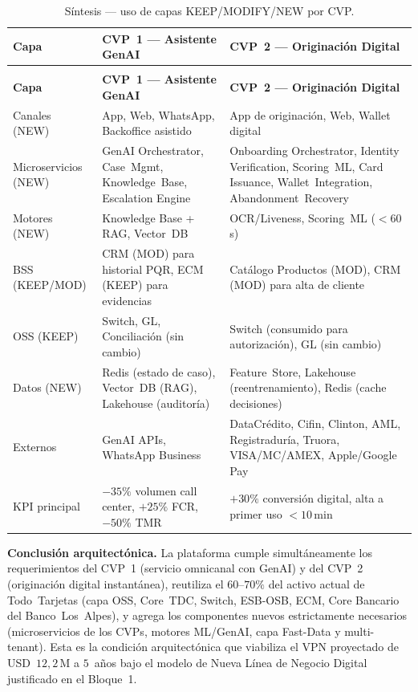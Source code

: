 \documentclass[11pt,letterpaper]{article}
\begin{document}
{\small
\renewcommand{\arraystretch}{1.25}
\begin{xltabular}{\textwidth}{@{}>{\RaggedRight\arraybackslash}p{2.7cm}@{\hspace{6pt}}>{\RaggedRight\arraybackslash}X@{\hspace{6pt}}>{\RaggedRight\arraybackslash}X@{}}
\caption{Síntesis — uso de capas KEEP/MODIFY/NEW por CVP.\label{tab:sintesis}}\\
\toprule
\textbf{Capa} & \textbf{CVP~1 — Asistente GenAI} & \textbf{CVP~2 — Originación Digital} \\
\midrule
\endfirsthead
{}\\
\toprule
\textbf{Capa} & \textbf{CVP~1 — Asistente GenAI} & \textbf{CVP~2 — Originación Digital} \\
\midrule
\endhead
\bottomrule
\endlastfoot
Canales (NEW) & App, Web, WhatsApp, Backoffice asistido & App de originación, Web, Wallet digital \\
Microservicios (NEW) & GenAI Orchestrator, Case~Mgmt, Knowledge~Base, Escalation Engine & Onboarding Orchestrator, Identity Verification, Scoring~ML, Card Issuance, Wallet~Integration, Abandonment~Recovery \\
Motores (NEW) & Knowledge Base + RAG, Vector~DB & OCR/Liveness, Scoring~ML ($<60$\,s) \\
BSS (KEEP/MOD) & CRM (MOD) para historial PQR, ECM (KEEP) para evidencias & Catálogo Productos (MOD), CRM (MOD) para alta de cliente \\
OSS (KEEP) & Switch, GL, Conciliación (sin cambio) & Switch (consumido para autorización), GL (sin cambio) \\
Datos (NEW) & Redis (estado de caso), Vector~DB (RAG), Lakehouse (auditoría) & Feature~Store, Lakehouse (reentrenamiento), Redis (cache decisiones) \\
Externos & GenAI APIs, WhatsApp Business & DataCrédito, Cifin, Clinton, AML, Registraduría, Truora, VISA/MC/AMEX, Apple/Google Pay \\
KPI principal & $-35\%$ volumen call center, $+25\%$ FCR, $-50\%$ TMR & $+30\%$ conversión digital, alta a primer uso $<10$\,min \\
\end{xltabular}}

\noindent\textbf{Conclusión arquitectónica.} La plataforma cumple
simultáneamente los requerimientos del CVP~1 (servicio omnicanal con
GenAI) y del CVP~2 (originación digital instantánea), reutiliza el
$60$--$70\%$ del activo actual de Todo~Tarjetas (capa OSS, Core~TDC,
Switch, ESB-OSB, ECM, Core Bancario del Banco~Los~Alpes), y agrega los
componentes nuevos estrictamente necesarios (microservicios de los CVPs,
motores ML/GenAI, capa Fast-Data y multi-tenant). Esta es la condición
arquitectónica que viabiliza el VPN proyectado de USD~$12{,}2$\,M a
$5$~años bajo el modelo de Nueva Línea de Negocio Digital justificado
en el Bloque~1.
\end{document}
